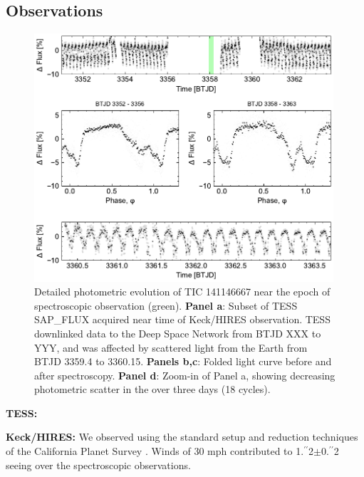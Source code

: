 \documentclass{nature3}
\newcommand{\farcs}{\mbox{\ensuremath{.\!\!^{\prime\prime}}}}%
\begin{document}
\newpage
\begin{methods}

\renewcommand{\figurename}{Extended Data Figure}
\renewcommand{\tablename}{Extended Data Table}
\setcounter{table}{0}  
\setcounter{figure}{0}  


\subsection{Observations}

\begin{figure}[!b]
  \centering
  \includegraphics[width=0.99\textwidth]{figures/sf1.pdf}
  \caption{Detailed photometric evolution of TIC 141146667 near the
  epoch of spectroscopic observation (green). 
  {\bf Panel a}: Subset of TESS SAP\_FLUX acquired near time of
  Keck/HIRES observation.
  TESS downlinked data to the Deep Space Network from BTJD XXX to
  YYY, and was affected by scattered light from the Earth from BTJD
  3359.4 to 3360.15.
  {\bf Panels b,c}: Folded light curve before and after spectroscopy.
  {\bf Panel d}: Zoom-in of Panel a, showing decreasing photometric
  scatter in the over three days (18 cycles).
  }
  \label{fig:fulllc}
\end{figure}

{\bf TESS:}

{\bf Keck/HIRES:}
We observed using the standard setup and reduction techniques of the
California Planet Survey \cite{Howard2010}.
Winds of 30 mph contributed to
1\farcs2$\pm$0\farcs2 seeing over the spectroscopic observations.  



\end{methods}
\end{document}

